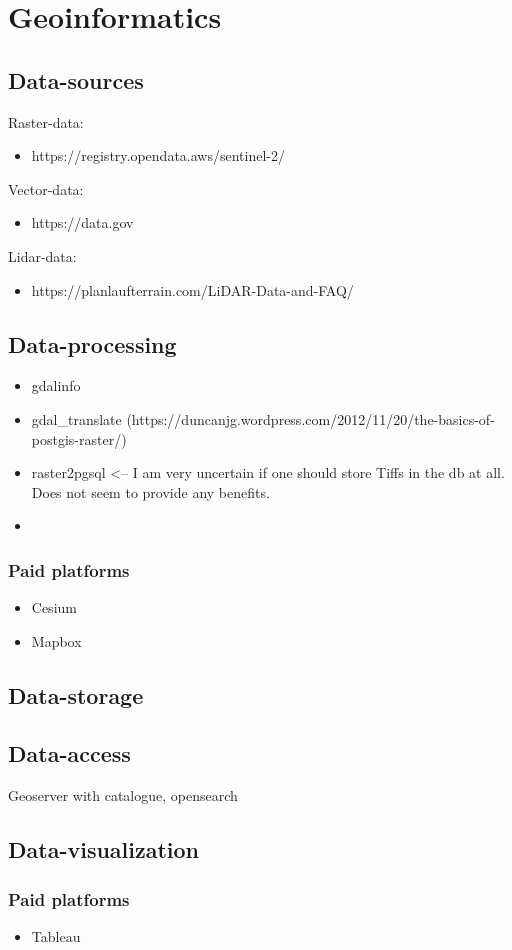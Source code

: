 \section{Geoinformatics}

\subsection{Data-sources}

Raster-data:
\begin{itemize}
    \item https://registry.opendata.aws/sentinel-2/
\end{itemize}

Vector-data:
\begin{itemize}
    \item https://data.gov
\end{itemize}

Lidar-data:
\begin{itemize}
    \item https://planlaufterrain.com/LiDAR-Data-and-FAQ/
\end{itemize}



\subsection{Data-processing}

\begin{itemize}
    \item gdalinfo 
    \item gdal_translate (https://duncanjg.wordpress.com/2012/11/20/the-basics-of-postgis-raster/)
    \item raster2pgsql <-- I am very uncertain if one should store Tiffs in the db at all. Does not seem to provide any benefits.
    \item 
\end{itemize}


\subsubsection{Paid platforms}
\begin{itemize}
    \item Cesium
    \item Mapbox
\end{itemize}


\subsection{Data-storage}

\subsection{Data-access}
Geoserver with catalogue, opensearch

\subsection{Data-visualization}

\subsubsection{Paid platforms}
\begin{itemize}
    \item Tableau
\end{itemize}